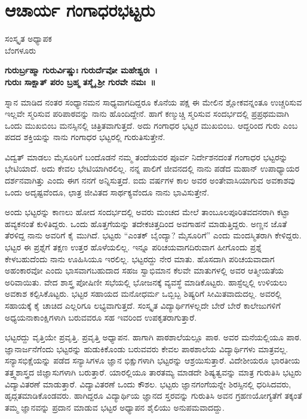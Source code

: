 {\fontsize{14}{16}\selectfont
\chapter{ಆಚಾರ್ಯ ಗಂಗಾಧರಭಟ್ಟರು}

\begin{center}
\smallskip
ಸಂಸ್ಕೃತ ಅಧ್ಯಾಪಕ\\
ಬೆಂಗಳೂರು
\addrule
\end{center}
\begin{center}
\textbf{ಗುರುರ್ಬ್ರಹ್ಮಾ ಗುರುರ್ವಿಷ್ಣುಃ ಗುರುರ್ದೆವೋ ಮಹೇಶ್ವರಃ~।\\
ಗುರುಃ ಸಾಕ್ಷಾತ್ ಪರಂ ಬ್ರಹ್ಮ ತಸ್ಮೈ ಶ್ರೀ ಗುರವೇ ನಮಃ~॥}
\end{center}
ಸ್ನಾನ ಮಾಡಿದ ನಂತರ ಸಂಧ್ಯಾನಮನ ಸಾಧ್ಯವಾಗದಿದ್ದರೂ ಕೊನೆಯ ಪಕ್ಷ ಈ ಮೇಲಿನ ಶ್ಲೋಕವನ್ನಂತೂ ಉಚ್ಚರಿಸುವ ಇಲ್ಲವೇ ಸ್ಮರಿಸುವ ಪರಿಪಾಠವನ್ನು ನಾನು ಹೊಂದಿದ್ದೇನೆ. ಹಾಗೆ ಕಣ್ಮುಚ್ಚಿ ಸ್ಮರಿಸುವ ಸಂದರ್ಭದಲ್ಲಿ ಪ್ರಪ್ರಥಮವಾಗಿ ಒಂದು ಮುಖಬಿಂಬ ಮನಸ್ಸಿ\-ನಲ್ಲಿ ಚಿತ್ರಿತವಾಗುತ್ತದೆ. ಅದು ಗಂಗಾಧರ ಭಟ್ಟರ ಮುಖಬಿಂಬ. ಆದ್ದರಿಂದ ಗುರು ಎಂಬ ಪದದ ಶಕ್ತಿಯನ್ನು ನಾನು ಗಂಗಾಧರ ಭಟ್ಟರಲ್ಲಿ ಗುರುತಿಸುತ್ತೇನೆ.

ವಿದ್ವತ್ ಮಾಡಲು ಮೈಸೂರಿಗೆ ಬಂದೊಡನೆ ನಮ್ಮ ತಂದೆಯವರ ಪೂರ್ವ ನಿರ್ದೇಶನ\-ದಂತೆ ಗಂಗಾಧರ ಭಟ್ಟರನ್ನು ಭೇಟಿಯಾದೆ. ಅದು ಕೇವಲ ಭೇಟಿಯಾಗಿರಲಿಲ್ಲ. ನನ್ನ ಪಾಲಿಗೆ ಜೀವನದಲ್ಲಿ ನಾನು ಪಡೆದ ಮಹಾನ್ ಉಪಾಧ್ಯಾಯರ ದರ್ಶನವಾಗಿತ್ತು ಎಂದು ಈಗ ನನಗೆ ಅನ್ನಿಸುತ್ತದೆ. ಐದು ವರ್ಷಗಳ ಕಾಲ ಅವರ ಅಂತೇವಾಸಿಯಾಗುವ ಅವಕಾಶವು ಒಂದು ಅದೃಷ್ಟವೆಂದೂ, ಛಾತ್ರ ಜೀವಿತದ ಸಾರ್ಥಕ್ಯವೆಂದೂ ನಾನು ಭಾವಿಸುತ್ತೇನೆ.

ಅಂದು ಭಟ್ಟರನ್ನು ಕಾಣಲು ಹೋದ ಸಂದರ್ಭದಲ್ಲಿ ಅವರು ಮಂಚದ ಮೇಲೆ ತಾಂಬೂಲಪೂರಿತವದನರಾಗಿ ಕಟ್ಟಾ ಹವ್ಯಕನಂತೆ ಕುಳಿತಿದ್ದರು. ಒಂದು ಹೊತ್ತಗೆಯನ್ನು ತದೇಕಚಿತ್ತದಿಂದ ಅವಗಾಹನೆ ಮಾಡುತ್ತಿದ್ದರು. ಅಣ್ಣನ ಜೊತೆ ತೆರಳಿದ್ದ ನಾನು ಅವರಿಗೆ ಕೈ ಮುಗಿದೆ. ಭಟ್ಟರು “ಎಂತಕ್ ಬೈಂದ್ಯಾ? ಮೈಸೂರಿಗೆ” ಎಂದು ಮಂದಸ್ಮಿತರಾಗಿ ಕೇಳಿದ್ದರು. ಭಟ್ಟರ ಈ ಪ್ರಶ್ನೆಗೆ ತಕ್ಷಣ ಉತ್ತರ ಹೊಳೆಯಲಿಲ್ಲ. ಇನ್ನೂ ಪರಿಚಯ\-ವಾಗದಿರುವಾಗ ಹೀಗೊಂದು ಪ್ರಶ್ನೆ ಕೇಳಬಹುದೆಂದು ನಾನು ಊಹಿಸಿಯೂ ಇರಲಿಲ್ಲ. ಭಟ್ಟರದ್ದು ನೇರ ಮಾತು. ಹೊಸದಾಗಿ ಪರಿಚಯವಾದಾಗ ಅಹಂಕಾರವೋ ಎಂದು ಭಾಸವಾಗಬಹುದಾದ ಸಹಜ ಸ್ವಾಭಿಮಾನ ಕೆಲವೇ ಮಾತುಗಳಲ್ಲಿ ಅವರ ಆತ್ಮೀಯತೆಯ ಅರಿವಾಯಿತು. ವೇದ ಶಾಸ್ತ್ರ ಪೋಷಿಣೀ ಸಭೆಯಲ್ಲಿ ಭೋಜನಕ್ಕೆ ವ್ಯವಸ್ಥೆ ಮಾಡಿ\-ಕೊಟ್ಟರು. ಹಾಸ್ಟೆಲ್ನಲ್ಲಿ ಉಳಿಯಲು ಅವಕಾಶ ಕಲ್ಪಿಸಿಕೊಟ್ಟರು. ಭಟ್ಟರ ಸಹಾಯದ ಮನೋಧರ್ಮ ಒಬ್ಬಿಬ್ಬ ಶಿಷ್ಯರಿಗೆ ಸೀಮಿತವಾದುದಲ್ಲ. ಅವರಲ್ಲಿ ಸಹಾಯಕ್ಕೆ ಕೈ ಚಾಚಿದ ಎಲ್ಲರಿಗೂ ಲಭ್ಯವಾಗುತ್ತದೆ. ಸಂಸ್ಕೃತ ವಿದ್ಯಾರ್ಥಿಗಳಲ್ಲದೇ ಬೇರೆ ಬೇರೆ ಕಾಲೇಜುಗಳಿಗೆ ಅಧ್ಯಯನಾಕಾಂಕ್ಷಿಗಳಾಗಿ ಬರುವವರೂ ಸಹ ಇವರಿಂದ ಉಪಕೃತ\-ರಾಗುತ್ತಾರೆ.

ಭಟ್ಟರದ್ದು ವೃತ್ತಿಯೇ ಪ್ರವೃತ್ತಿ. ಪ್ರವೃತ್ತಿ ಅಧ್ಯಾಪನ. ಹಾಗಾಗಿ ಪಾಠಶಾಲೆಯಲ್ಲೂ ಪಾಠ. ಅವರ ಮನೆಯಲ್ಲಿಯೂ ಪಾಠ. ಜ್ಞಾನಾರ್ಜನೆಗೆಂದು ಭಟ್ಟರನ್ನು ಹುಡುಕಿಕೊಂಡು ಬರುವವರು ಕೇವಲ ಪಾಠಶಾಲೆಯ ವಿದ್ಯಾರ್ಥಿಗಳು ಮಾತ್ರವಲ್ಲ. ಸನ್ಯಾಸಭಿಕ್ಷೆಯನ್ನು ಪಡೆದ ಸನ್ಯಾಸಿಗಳೂ ಜ್ಞಾನ ಭಿಕ್ಷುಗಳಾಗಿ ಭಟ್ಟರನ್ನು ಆಶ್ರಯಿಸುತ್ತಾರೆ. ವಿದೇಶೀಯರೂ ಭಾರತೀಯ ತತ್ತ್ವಶಾಸ್ತ್ರದ ಜಿಜ್ಞಾಸುಗಳಾಗಿ ಬರುತ್ತಾರೆ. ಯಾರಲ್ಲಿಯೂ ತಾರತಮ್ಯ ಮಾಡದೇ ಶಿಷ್ಯತ್ವವನ್ನು ಮಾತ್ರ ಗುರುತಿಸಿ ಭಟ್ಟರು ವಿದ್ಯಾವಿತರಣೆ ಮಾಡುತ್ತಾರೆ. ವಿದ್ಯಾವಿತರಣೆ ಒಂದು ಕೌಶಲ. ಭಟ್ಟರು ಜ್ಞಾನಗಂಗೆಯನ್ನೇ ಶಿರಸ್ಸಿನಲ್ಲಿ ಧರಿಸಿದವರು, ಹೃದ್ಗತಮಾಡಿಕೊಂಡವರು. ಹಾಗಿದ್ದರೂ ವಿದ್ಯಾರ್ಥಿಯ ಜ್ಞಾನದ ಸ್ತರವನ್ನು ಗುರುತಿಸಿ ಅವನ ಗ್ರಹಣಯೋಗ್ಯತೆಗೆ ತಕ್ಕಂತೆ ತಮ್ಮ ಜ್ಞಾನವನ್ನು ಪ್ರದಾನ ಮಾಡುವ ಭಟ್ಟರ ಅಧ್ಯಾಪನ ಶೈಲಿಯು ಅನುಪಮವಾದದ್ದು.

}
